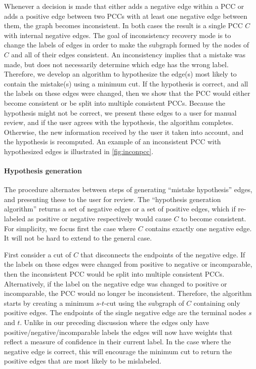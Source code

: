 Whenever a decision is made that either adds a negative edge within a PCC or adds a positive edge between two
  PCCs with at least one negative edge between them, the graph becomes inconsistent.
In both cases the result is a single PCC $C$ with internal negative edges.
The goal of inconsistency recovery mode is to change the labels of edges in order to make the subgraph formed by
  the nodes of $C$ and all of their edges consistent.
An inconsistency implies that a mistake was made, but does not necessarily determine which edge has the wrong
  label.
Therefore, we develop an algorithm to hypothesize the edge(s) most likely to contain the mistake(s) using a
  minimum cut.
If the hypothesis is correct, and all the labels on these edges were changed, then we show that the PCC would
  either become consistent or be split into multiple consistent PCCs.
Because the hypothesis might not be correct, we present these edges to a user for manual review, and if the user
  agrees with the hypothesis, the algorithm completes.
Otherwise, the new information received by the user it taken into account, and the hypothesis is recomputed.
An example of an inconsistent PCC with hypothesized edges is illustrated in \cref{fig:inconpcc}.

\inconpcc{}

\paragraph{Hypothesis generation}
The procedure alternates between steps of generating ``mistake hypothesis'' edges, and presenting these to the
  user for review.
The ``hypothesis generation algorithm'' returns a set of negative edges or a set of positive edges, which if
  re-labeled as positive or negative respectively would cause $C$ to become consistent.
For simplicity, we focus first the case where $C$ contains exactly one negative edge.
It will not be hard to extend to the general case.


First consider a cut of $C$ that disconnects the endpoints of the negative edge.
If the labels on these edges were changed from positive to negative or incomparable, then the inconsistent PCC
  would be split into multiple consistent PCCs.
Alternatively, if the label on the negative edge was changed to positive or incomparable, the PCC would no longer
  be inconsistent.
Therefore, the algorithm starts by creating a minimum $s$-$t$-cut using the subgraph of $C$ containing only
  positive edges.
The endpoints of the single negative edge are the terminal nodes $s$ and $t$.
Unlike in our preceding discussion where the edges only have positive/negative/incomparable labels the edges will
  now have weights that reflect a measure of confidence in their current label.
In the case where the negative edge is correct, this will encourage the minimum cut to return the positive edges
  that are most likely to be mislabeled.

